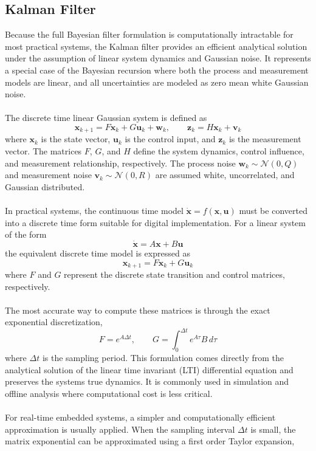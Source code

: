 \subsection{Kalman Filter}
Because the full Bayesian filter formulation is computationally intractable for most practical systems, the Kalman filter provides an efficient analytical solution under the assumption of linear system dynamics and Gaussian noise. It represents a special case of the Bayesian recursion where both the process and measurement models are linear, and all uncertainties are modeled as zero mean white Gaussian noise.  
\\ \\
The discrete time linear Gaussian system is defined as
$$
    \mathbf{x}_{k+1} = F\mathbf{x}_k + G\mathbf{u}_k + \mathbf{w}_k, \qquad
    \mathbf{z}_k = H\mathbf{x}_k + \mathbf{v}_k
$$
where $\mathbf{x}_k$ is the state vector, $\mathbf{u}_k$ is the control input, and $\mathbf{z}_k$ is the measurement vector. The matrices $F$, $G$, and $H$ define the system dynamics, control influence, and measurement relationship, respectively. The process noise $\mathbf{w}_k \sim \mathcal{N}(0, Q)$ and measurement noise $\mathbf{v}_k \sim \mathcal{N}(0, R)$ are assumed white, uncorrelated, and Gaussian distributed.  
\\ \\
In practical systems, the continuous time model $\dot{\mathbf{x}} = f(\mathbf{x}, \mathbf{u})$ must be converted into a discrete time form suitable for digital implementation. For a linear system of the form
$$
    \dot{\mathbf{x}} = A\mathbf{x} + B\mathbf{u}
$$
the equivalent discrete time model is expressed as
$$
    \mathbf{x}_{k+1} = F\mathbf{x}_k + G\mathbf{u}_k
$$
where $F$ and $G$ represent the discrete state transition and control matrices, respectively.  
\\ \\
The most accurate way to compute these matrices is through the exact exponential discretization,
$$
    F = e^{A\Delta t}, \qquad
    G = \int_0^{\Delta t} e^{A\tau}B\,d\tau
$$
where $\Delta t$ is the sampling period. This formulation comes directly from the analytical solution of the linear time invariant (LTI) differential equation and preserves the systems true dynamics. It is commonly used in simulation and offline analysis where computational cost is less critical.  
\\ \\
For real-time embedded systems, a simpler and computationally efficient approximation is usually applied. When the sampling interval $\Delta t$ is small, the matrix exponential can be approximated using a first order Taylor expansion,
